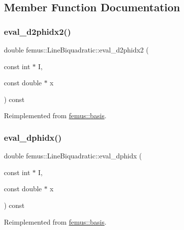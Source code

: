 \subsection{Member Function Documentation}
\mbox{\label{classfemus_1_1_line_biquadratic_ab6a7b188104b706b792227aaab0ebf2a}} 
\subsubsection{\texorpdfstring{eval\+\_\+d2phidx2()}{eval\_d2phidx2()}}
{\footnotesize\ttfamily double femus\+::\+Line\+Biquadratic\+::eval\+\_\+d2phidx2 (\begin{DoxyParamCaption}\item[{const int $\ast$}]{I,  }\item[{const double $\ast$}]{x }\end{DoxyParamCaption}) const\hspace{0.3cm}{\ttfamily [virtual]}}



Reimplemented from \mbox{\hyperlink{classfemus_1_1basis_a0a9839e75d1c9c8302486fc072eed028}{femus\+::basis}}.

\mbox{\label{classfemus_1_1_line_biquadratic_a05d4702daa38615c5cb8ebd0045d61a4}} 
\subsubsection{\texorpdfstring{eval\+\_\+dphidx()}{eval\_dphidx()}}
{\footnotesize\ttfamily double femus\+::\+Line\+Biquadratic\+::eval\+\_\+dphidx (\begin{DoxyParamCaption}\item[{const int $\ast$}]{I,  }\item[{const double $\ast$}]{x }\end{DoxyParamCaption}) const\hspace{0.3cm}{\ttfamily [virtual]}}



Reimplemented from \mbox{\hyperlink{classfemus_1_1basis_a4db7d29cf8a753ddbccc4a297dafa0bf}{femus\+::basis}}.


